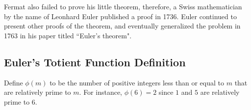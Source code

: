 Fermat also failed to prove his little theorem, therefore, a Swiss mathematician by the name of Leonhard Euler published a proof in 1736. Euler continued to present other proofs of the theorem, and eventually generalized the problem in 1763 in his paper titled ``Euler's theorem".

\subsection{Euler's Totient Function Definition}
\begin{defi} Define $\phi(m)$ to be the number of positive integers less than or equal to $m$ that are relatively prime to $m$. For instance, $\phi(6)=2$ since $1$ and $5$ are relatively prime to $6$. \end{defi}


\clearpage

